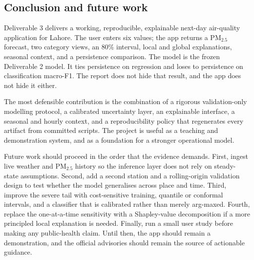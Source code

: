 \subsection{Conclusion and future work}
\label{sec:conclusion}

Deliverable 3 delivers a working, reproducible, explainable next-day air-quality
application for Lahore. The user enters six values; the app returns a PM$_{2.5}$
forecast, two category views, an 80\% interval, local and global explanations,
seasonal context, and a persistence comparison. The model is the frozen
Deliverable 2 model. It ties persistence on regression and loses to persistence
on classification macro-F1. The report does not hide that result, and the app
does not hide it either.

The most defensible contribution is the combination of a rigorous
validation-only modelling protocol, a calibrated uncertainty layer, an
explainable interface, a seasonal and hourly context, and a reproducibility
policy that regenerates every artifact from committed scripts. The project is
useful as a teaching and demonstration system, and as a foundation for a
stronger operational model.

Future work should proceed in the order that the evidence demands. First, ingest
live weather and PM$_{2.5}$ history so the inference layer does not rely on
steady-state assumptions. Second, add a second station and a rolling-origin
validation design to test whether the model generalises across place and time.
Third, improve the severe tail with cost-sensitive training, quantile or
conformal intervals, and a classifier that is calibrated rather than merely
arg-maxed. Fourth, replace the one-at-a-time sensitivity with a Shapley-value
decomposition if a more principled local explanation is needed. Finally, run a
small user study before making any public-health claim. Until then, the app
should remain a demonstration, and the official advisories should remain the
source of actionable guidance.
